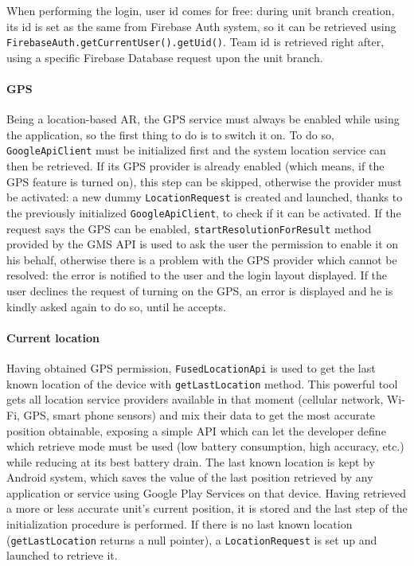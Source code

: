 			When performing the login, user id comes for free: during unit branch creation, its id is set as the same from Firebase Auth system, so it can be retrieved using \lstinline|FirebaseAuth.getCurrentUser().getUid()|.
			Team id is retrieved right after, using a specific Firebase Database request upon the unit branch.
			
			\paragraph{GPS}
			
			Being a location-based AR, the GPS service must always be enabled while using the application, so the first thing to do is to switch it on.
			To do so, \lstinline|GoogleApiClient| must be initialized first and the system location service can then be retrieved.
			If its GPS provider is already enabled (which means, if the GPS feature is turned on), this step can be skipped, otherwise the provider must be activated: a new dummy \lstinline|LocationRequest| is created and launched, thanks to the previously initialized \lstinline|GoogleApiClient|, to check if it can be activated.
			If the request says the GPS can be enabled,  \lstinline|startResolutionForResult| method provided by the GMS API is used to ask the user the permission to enable it on his behalf, otherwise there is a problem with the GPS provider which cannot be resolved: the error is notified to the user and the login layout displayed.
			If the user declines the request of turning on the GPS, an error is displayed and he is kindly asked again to do so, until he accepts.
			
			\paragraph{Current location}
			
			Having obtained GPS permission, \lstinline|FusedLocationApi| is used to get the last known location of the device with \lstinline|getLastLocation| method.
			This powerful tool gets all location service providers available in that moment (cellular network, Wi-Fi, GPS, smart phone sensors) and mix their data to get the most accurate position obtainable, exposing a simple API which can let the developer define which retrieve mode must be used (low battery consumption, high accuracy, etc.) while reducing at its best battery drain.
			The last known location is kept by Android system, which saves the value of the last position retrieved by any application or service using Google Play Services on that device.
			Having retrieved a more or less accurate unit's current position, it is stored and the last step of the initialization procedure is performed.
			If there is no last known location (\lstinline|getLastLocation| returns a null pointer), a \lstinline|LocationRequest| is set up and launched to retrieve it.
			
